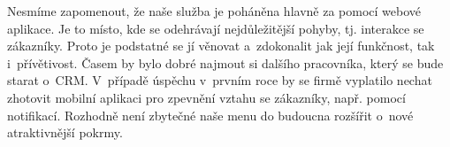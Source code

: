 Nesmíme zapomenout, že naše služba je poháněna hlavně za pomocí webové aplikace. Je to místo, kde se odehrávají nejdůležitější pohyby, tj. interakce se zákazníky. Proto je podstatné se jí věnovat a~zdokonalit jak její funkčnost, tak i~přívětivost. Časem by bylo dobré najmout si dalšího pracovníka, který se bude starat o~CRM. V~případě úspěchu v~prvním roce by se firmě vyplatilo nechat zhotovit mobilní aplikaci pro zpevnění vztahu se zákazníky, např. pomocí notifikací. Rozhodně není zbytečné naše menu do budoucna rozšířit o~nové atraktivnější pokrmy.

